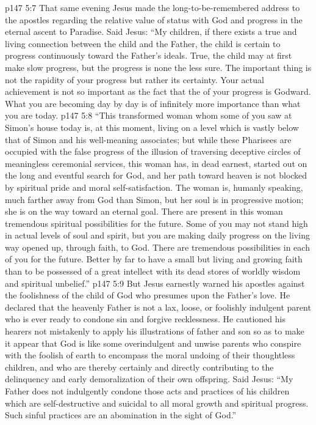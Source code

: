 \pc \vs p147 5:7 That same evening Jesus made the long\hyp{}to\hyp{}be\hyp{}remembered address to the apostles regarding the relative value of status with God and progress in the eternal ascent to Paradise. Said Jesus: “My children, if there exists a true and living connection between the child and the Father, the child is certain to progress continuously toward the Father’s ideals. True, the child may at first make slow progress, but the progress is none the less sure. The important thing is not the rapidity of your progress but rather its certainty. Your actual achievement is not so important as the fact that the  of your progress is Godward. What you are becoming day by day is of infinitely more importance than what you are today.
\vs p147 5:8 \textcolor{ubdarkred}{“This transformed woman whom some of you saw at Simon’s house today is, at this moment, living on a level which is vastly below that of Simon and his well\hyp{}meaning associates; but while these Pharisees are occupied with the false progress of the illusion of traversing deceptive circles of meaningless ceremonial services, this woman has, in dead earnest, started out on the long and eventful search for God, and her path toward heaven is not blocked by spiritual pride and moral self\hyp{}satisfaction. The woman is, humanly speaking, much farther away from God than Simon, but her soul is in progressive motion; she is on the way toward an eternal goal. There are present in this woman tremendous spiritual possibilities for the future. Some of you may not stand high in actual levels of soul and spirit, but you are making daily progress on the living way opened up, through faith, to God. There are tremendous possibilities in each of you for the future. Better by far to have a small but living and growing faith than to be possessed of a great intellect with its dead stores of worldly wisdom and spiritual unbelief.”}
\vs p147 5:9 But Jesus earnestly warned his apostles against the foolishness of the child of God who presumes upon the Father’s love. He declared that the heavenly Father is not a lax, loose, or foolishly indulgent parent who is ever ready to condone sin and forgive recklessness. He cautioned his hearers not mistakenly to apply his illustrations of father and son so as to make it appear that God is like some overindulgent and unwise parents who conspire with the foolish of earth to encompass the moral undoing of their thoughtless children, and who are thereby certainly and directly contributing to the delinquency and early demoralization of their own offspring. Said Jesus: \textcolor{ubdarkred}{“My Father does not indulgently condone those acts and practices of his children which are self\hyp{}destructive and suicidal to all moral growth and spiritual progress. Such sinful practices are an abomination in the sight of God.”}
